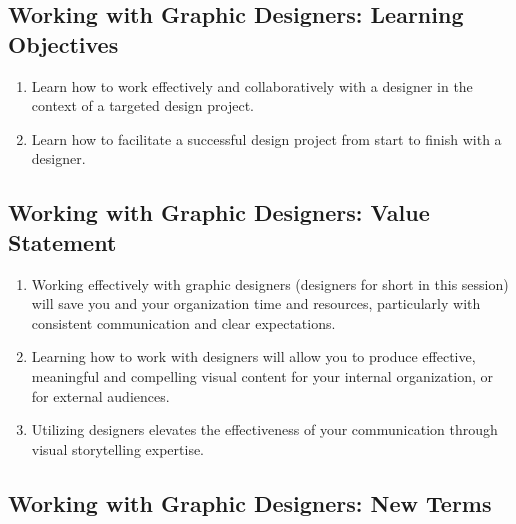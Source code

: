 \documentclass[
]{book}
\providecommand{\tightlist}{%
  \setlength{\itemsep}{0pt}\setlength{\parskip}{0pt}}
\begin{document}
\hypertarget{working-with-graphic-designers-learning-objectives}{%
\subsection{Working with Graphic Designers: Learning Objectives}\label{working-with-graphic-designers-learning-objectives}}

\begin{enumerate}
\def\labelenumi{\arabic{enumi}.}
\tightlist
\item
  Learn how to work effectively and collaboratively with a designer in the context of a targeted design project.
\item
  Learn how to facilitate a successful design project from start to finish with a designer.
\end{enumerate}

\hypertarget{working-with-graphic-designers-value-statement}{%
\subsection{Working with Graphic Designers: Value Statement}\label{working-with-graphic-designers-value-statement}}

\begin{enumerate}
\def\labelenumi{\arabic{enumi}.}
\tightlist
\item
  Working effectively with graphic designers (designers for short in this session) will save you and your organization time and resources, particularly with consistent communication and clear expectations.
\item
  Learning how to work with designers will allow you to produce effective, meaningful and compelling visual content for your internal organization, or for external audiences.
\item
  Utilizing designers elevates the effectiveness of your communication through visual storytelling expertise.
\end{enumerate}

\hypertarget{working-with-graphic-designers-new-terms}{%
\subsection{Working with Graphic Designers: New Terms}\label{working-with-graphic-designers-new-terms}}
\end{document}
